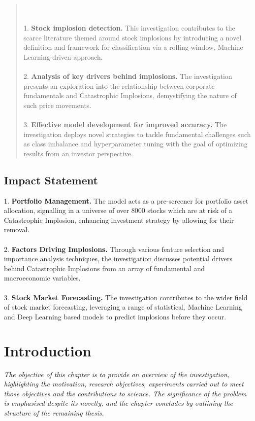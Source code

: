 \documentclass[a4paper]{report}
\begin{document}
\begin{abstract}
  \\\\1.	{\bfseries Stock implosion detection.} This investigation contributes to the scarce literature themed around stock implosions by introducing a novel definition and framework for classification via a rolling-window, Machine Learning-driven approach.
  \\\\2.	{\bfseries Analysis of key drivers behind implosions.} The investigation presents an exploration into the relationship between corporate fundamentals and Catastrophic Implosions, demystifying the nature of such price movements.
  \\\\3.	{\bfseries Effective model development for improved accuracy.} The investigation deploys novel strategies to tackle fundamental challenges such as class imbalance and hyperparameter tuning with the goal of optimizing results from an investor perspective.
\end{abstract}

\newpage

\section*{Impact Statement}
1.	{\bfseries Portfolio Management.} The model acts as a pre-screener for portfolio asset allocation, signalling in a universe of over 8000 stocks which are at risk of a Catastrophic Implosion, enhancing investment strategy by allowing for their removal.
\\\\2.	{\bfseries Factors Driving Implosions.} Through various feature selection and importance analysis techniques, the investigation discusses potential drivers behind Catastrophic Implosions from 
an array of fundamental and macroeconomic variables.
\\\\3.	{\bfseries Stock Market Forecasting.} The investigation contributes to the wider field of stock market forecasting, leveraging a range of statistical, Machine Learning and 
Deep Learning based models to predict implosions before they occur.


\tableofcontents

\listoffigures
\listoftables

\clearpage %

\setcounter{page}{1}


\chapter{Introduction}
\textit{The objective of this chapter is to provide an overview of the investigation, highlighting the motivation, research objectives, experiments carried out to meet those objectives and the contributions to science. The significance of the problem
is emphasised despite its novelty, and the chapter concludes by outlining the structure of the remaining thesis.}
\end{document}
